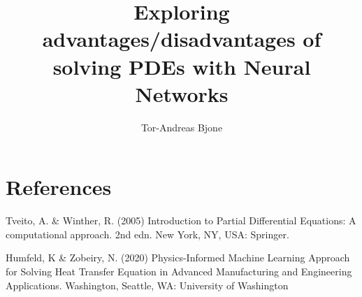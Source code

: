 \documentclass[a4paper,10pt,english]{article}
\title{Exploring advantages/disadvantages of solving PDEs with Neural Networks}
\author{Tor-Andreas Bjone}
\begin{document}
\maketitle
\tableofcontents








\section*{References}  
\begin{itemize}
 Tveito, A. \& Winther, R. (2005) Introduction to Partial Differential Equations: A computational approach. 2nd edn. New York, NY, USA: Springer.

 Humfeld, K \& Zobeiry, N. (2020)  Physics-Informed Machine Learning Approach for Solving Heat Transfer Equation
    in Advanced Manufacturing and Engineering Applications. Washington, Seattle, WA: University of Washington
\end{itemize}
\end{document}
